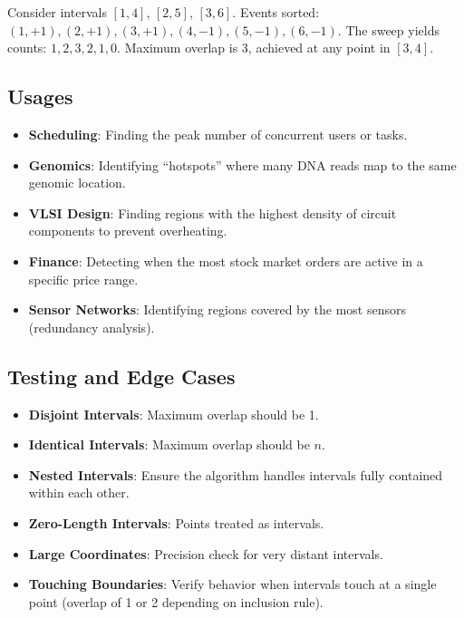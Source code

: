 \begin{example}\label{ex:sweep_1d}
Consider intervals $[1,4]$, $[2,5]$, $[3,6]$. Events sorted: $(1,+1),(2,+1),(3,+1),(4,-1),(5,-1),(6,-1)$. The sweep yields counts: $1, 2, 3, 2, 1, 0$. Maximum overlap is 3, achieved at any point in $[3,4]$.
\end{example}

\subsection{Usages}

\begin{itemize}
\item \textbf{Scheduling}: Finding the peak number of concurrent users or tasks.
\item \textbf{Genomics}: Identifying ``hotspots'' where many DNA reads map to the same genomic location.
\item \textbf{VLSI Design}: Finding regions with the highest density of circuit components to prevent overheating.
\item \textbf{Finance}: Detecting when the most stock market orders are active in a specific price range.
\item \textbf{Sensor Networks}: Identifying regions covered by the most sensors (redundancy analysis).
\end{itemize}

\subsection{Testing and Edge Cases}

\begin{itemize}
\item \textbf{Disjoint Intervals}: Maximum overlap should be 1.
\item \textbf{Identical Intervals}: Maximum overlap should be $n$.
\item \textbf{Nested Intervals}: Ensure the algorithm handles intervals fully contained within each other.
\item \textbf{Zero-Length Intervals}: Points treated as intervals.
\item \textbf{Large Coordinates}: Precision check for very distant intervals.
\item \textbf{Touching Boundaries}: Verify behavior when intervals touch at a single point (overlap of 1 or 2 depending on inclusion rule).
\end{itemize}


